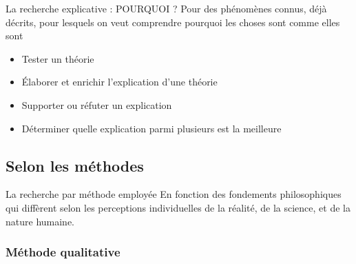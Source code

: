\documentclass[french]{beamer}
\begin{document}
\begin{frame}{La recherche explicative : POURQUOI ?}
Pour des phénomènes connus, déjà décrits, pour lesquels on veut comprendre pourquoi les choses sont comme elles sont
\begin{itemize}
	\item Tester un théorie
	\item Élaborer et enrichir l'explication d'une théorie
	\item Supporter ou réfuter un explication
	\item Déterminer quelle explication parmi plusieurs est la meilleure
\end{itemize}
\end{frame}


\subsection{Selon les méthodes}

\begin{frame}{La recherche par méthode employée}
En fonction des fondements philosophiques qui diffèrent selon les perceptions individuelles de la réalité, de la science, et de la nature humaine.
\begin{center}
\end{center}
\end{frame}

\subsubsection{Méthode qualitative}
\end{document}
